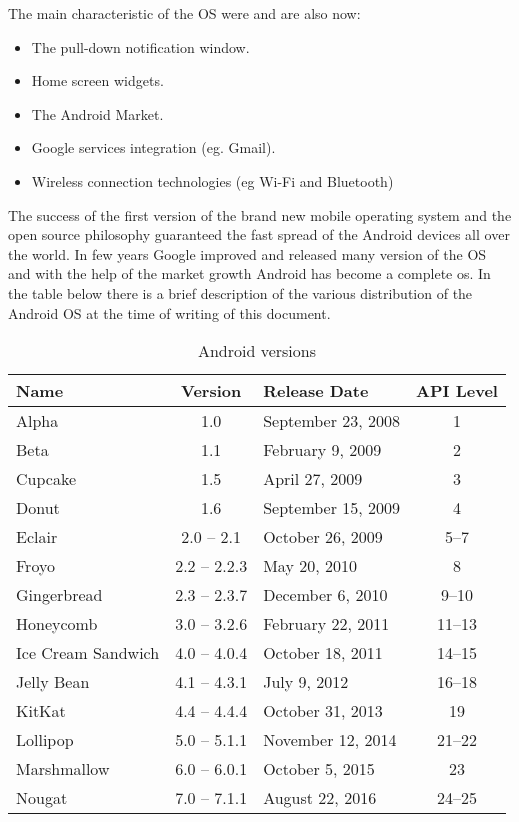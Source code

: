 The main characteristic of the OS were and are also now:
\begin{itemize}
	\item The pull-down notification window.
	\item Home screen widgets.
	\item The Android Market.
	\item Google services integration (eg. Gmail).
	\item Wireless connection technologies (eg Wi-Fi and Bluetooth)
\end{itemize}
The success of the first version of the brand new mobile operating system and the open source philosophy guaranteed the fast spread of the Android devices all over the world. In few years Google improved and released many version of the OS and with the help of the market growth Android has become a complete os. 
In the table below there is a brief description of the various distribution of the Android OS at the time of writing of this document.\\
\begin{table}[h]
	\caption{Android versions}
	\label{tab:vers}
	\centering
	\begin{tabular}{lclc}
		\toprule
		\textbf{Name} & \textbf{Version}  & \textbf{Release Date} & \textbf{API Level}\\
		\midrule
		Alpha &	1.0 & September 23, 2008 & 1 \\
		Beta & 1.1 & February 9, 2009 & 2 \\
		Cupcake & 1.5 & April 27, 2009 & 3 \\
		Donut &	1.6 & September 15, 2009 & 4 \\
		Eclair & 2.0 – 2.1 & October 26, 2009 & 5–7 \\
		Froyo & 2.2 – 2.2.3 & May 20, 2010 & 8 \\
		Gingerbread & 2.3 – 2.3.7 & December 6, 2010 & 9–10 \\	
		Honeycomb & 3.0 – 3.2.6 & February 22, 2011 & 11–13 \\
		Ice Cream Sandwich & 4.0 – 4.0.4 & October 18, 2011 & 14–15 \\
		Jelly Bean & 4.1 – 4.3.1 & July 9, 2012 & 16–18 \\
		KitKat & 4.4 – 4.4.4 & October 31, 2013 & 19 \\
		Lollipop & 5.0 – 5.1.1 & November 12, 2014 & 21–22 \\
		Marshmallow & 6.0 – 6.0.1 & October 5, 2015 & 23 \\
		Nougat & 7.0 – 7.1.1 & August 22, 2016 & 24–25 \\
		\bottomrule
	\end{tabular}
\end{table}
